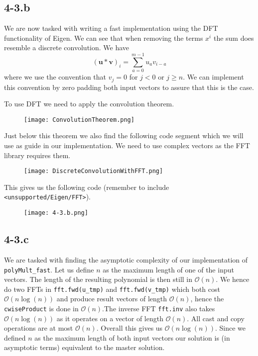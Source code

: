 \documentclass{article}
\begin{document}
\subsection*{4-3.b}
We are now tasked with writing a fast implementation using the DFT functionality of Eigen. We can see that when removing the terms $x^{i}$ the sum does resemble a discrete convolution. We have
\begin{equation*}
    \left(\mathbf{u}*\mathbf{v}\right)_{i} = \sum_{a=0}^{m-1}u_{a}v_{i - a}
\end{equation*}
where we use the convention that $v_{j} = 0$ for $j < 0$ or $j \geq n$. We can implement this convention by zero padding both input vectors to assure that this is the case. 

\pagebreak
\noindent To use DFT we need to apply the convolution theorem.
\begin{figure}[!hbt]
    \centering
\texttt{[image: ConvolutionTheorem.png]}
\end{figure}

\noindent Just below this theorem we also find the following code segment which we will use as guide in our implementation. We need to use complex vectors as the FFT library requires them.

\begin{figure}[!hbt]
    \centering
\texttt{[image: DiscreteConvolutionWithFFT.png]}
\end{figure}

\noindent This gives us the following code (remember to include \verb|<unsupported/Eigen/FFT>|).

\begin{figure}[!hbt]
    \centering
\texttt{[image: 4-3.b.png]}
\end{figure}

\subsection*{4-3.c}
We are tasked with finding the asymptotic complexity of our implementation of \verb|polyMult_fast|. Let us define $n$ as the maximum length of one of the input vectors. The length of the resulting polynomial is then still in $\mathcal{O}\left(n\right)$. We hence do two FFTs in \verb|fft.fwd(u_tmp)| and \verb|fft.fwd(v_tmp)| which both cost $\mathcal{O}\left(n\log\left(n\right)\right)$ and produce result vectors of length $\mathcal{O}\left(n\right)$, hence the \verb|cwiseProduct| is done in $\mathcal{O}\left(n\right)$.The inverse FFT \verb|fft.inv| also takes $\mathcal{O}\left(n\log\left(n\right)\right)$ as it operates on a vector of length $\mathcal{O}\left(n\right)$. All cast and copy operations are at most $\mathcal{O}\left(n\right)$. Overall this gives us $\mathcal{O}\left(n\log\left(n\right)\right)$. Since we defined $n$ as the maximum length of both input vectors our solution is (in asymptotic terms) equivalent to the master solution.
\end{document}
